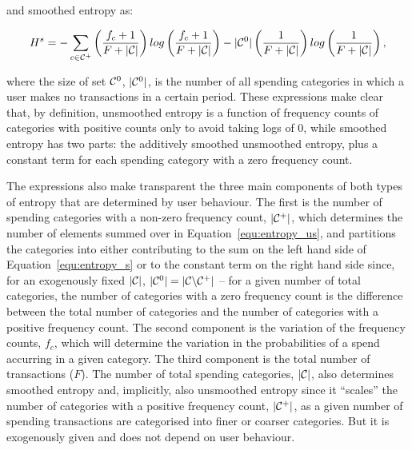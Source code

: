 and smoothed entropy as:

\begin{equation}
\label{equ:entropy_s}
H^s = -\sum_{c \in \mathcal{C}^{+}}{\left(\frac{f_c + 1}{F + |\mathcal{C}|}\right)
log\left(\frac{f_c + 1}{F + |\mathcal{C}|}\right)}
- |\mathcal{C}^{0}|\left(\frac{1}{F + |\mathcal{C}|}\right)
log\left(\frac{1}{F + |\mathcal{C}|}\right),
\end{equation}

\noindent where the size of set $\mathcal{C}^{0}$, $|\mathcal{C}^{0}|$, is the number of all
spending categories in which a user makes no transactions in a certain period.
These expressions make clear that, by definition, unsmoothed entropy is a
function of frequency counts of categories with positive counts only to avoid
taking logs of 0, while smoothed entropy has two parts: the additively smoothed
unsmoothed entropy, plus a constant term for each spending category with a zero
frequency count.

The expressions also make transparent the three main components of both types
of entropy that are determined by user behaviour. The first is the number of
spending categories with a non-zero frequency count, $|\mathcal{C}^{+}|$, which
determines the number of elements summed over in Equation~\ref{equ:entropy_us},
and partitions the categories into either contributing to the sum on the left
hand side of Equation~\ref{equ:entropy_s} or to the constant term on the right
hand side since, for an exogenously fixed $|\mathcal{C}|$, $|\mathcal{C}^{0}| = |\mathcal{C}
\backslash \mathcal{C}^{+}|$ -- for a given number of total categories, the number of
categories with a zero frequency count is the difference between the total
number of categories and the number of categories with a positive frequency
count. The second component is the variation of the frequency counts, $f_c$,
which will determine the variation in the probabilities of a spend accurring in
a given category. The third component is the total number of transactions
($F$). The number of total spending categories, $|\mathcal{C}|$, also determines
smoothed entropy and, implicitly, also unsmoothed entropy since it ``scales''
the number of categories with a positive frequency count, $|\mathcal{C}^{+}|$, as a
given number of spending transactions are categorised into finer or coarser
categories. But it is exogenously given and does not depend on user behaviour.


